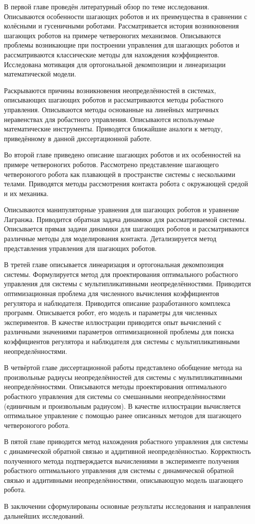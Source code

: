В первой главе проведён литературный обзор по теме исследования. Описываются особенности шагающих роботов и их преимущества в сравнении с колёсными и гусеничными роботами. Рассматривается история возникновения шагающих роботов на примере четвероногих механизмов. Описываются проблемы возникающие при построении управления для шагающих роботов и рассматриваются классические методы для нахождения коэффициентов. Исследована мотивация для ортогональной декомпозиции и линеаризации математической модели. 

Раскрываются причины возникновения неопределённостей в системах, описывающих шагающих роботов и рассматриваются методы робастного управления. 
Описываются методы основанные на линейных матричных неравенствах для робастного управления. Описываются используемые математические инструменты. Приводятся ближайшие аналоги к методу, приведённому в данной диссертационной работе.

Во второй главе приведено описание шагающих роботов и их особенностей на примере четвероногих роботов. Рассмотрено представление шагающего четвероногого робота как плавающей в пространстве системы с несколькими телами. Приводятся методы рассмотрения контакта робота с окружающей средой и их механика. 

Описываются манипуляторные уравнения для шагающих роботов и уравнение Лагранжа. Приводится обратная задача динамики для рассматриваемой системы. Описывается прямая задачи динамики для шагающих роботов и рассматриваются различные методы для моделирования контакта. Детализируется метод представления управления для шагающих роботов.

В третей главе описывается линеаризация и ортогональная декомпозиция системы. Формулируется метод для проектирования оптимального робастного управления для системы с мультипликативными неопределённостями. Приводится оптимизационная проблема для численного вычисления коэффициентов регулятора и наблюдателя. Приводится описание разработанного комплекса программ. Описывается робот, его модель и параметры для численных экспериментов. В качестве иллюстрации приводится опыт вычислений с различными значениями параметров оптимизационной проблемы для поиска коэффициентов регулятора и наблюдателя для системы с мультипликативными неопределённостями. 

В четвёртой главе диссертационной работы представлено обобщение метода на произвольные радиусы неопределённостей для системы с мультипликативными неопределённостями. Описываются методы проектирования оптимального робастного управления для системы со смешанными неопределённостями (единичным и произвольным радиусом). В качестве иллюстрации вычисляется оптимальное управление с помощью ранее описанных методов для шагающего четвероногого робота.

В пятой главе приводится метод нахождения робастного управления для системы с динамической обратной связью и аддитивной неопределённостью. Корректность полученного метода подтверждается вычислениями в эксперименте получения робастного оптимального управления для системы с динамической обратной связью и аддитивными неопределённостями, описывающую модель шагающего робота.

В заключении сформулированы основные результаты исследования и направления дальнейших исследований.